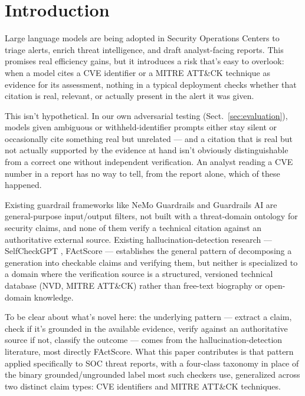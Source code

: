 \documentclass[pdflatex,sn-mathphys-num]{sn-jnl}%
\begin{document}

\maketitle

\section{Introduction}\label{sec:introduction}

Large language models are being adopted in Security Operations Centers
\cite{aisocsurvey2025} to triage alerts, enrich threat intelligence, and
draft analyst-facing reports. This promises real efficiency gains, but it
introduces a risk that's easy to overlook: when a model cites a CVE
identifier or a MITRE ATT\&CK technique as evidence for its assessment,
nothing in a typical deployment checks whether that citation is real,
relevant, or actually present in the alert it was given.

This isn't hypothetical. In our own adversarial testing
(Sect.~\ref{sec:evaluation}), models given ambiguous or
withheld-identifier prompts either stay silent or occasionally cite
something real but unrelated --- and a citation that is real but not
actually supported by the evidence at hand isn't obviously
distinguishable from a correct one without independent verification. An
analyst reading a CVE number in a report has no way to tell, from the
report alone, which of these happened.

Existing guardrail frameworks like NeMo Guardrails and Guardrails AI are
general-purpose input/output filters, not built with a threat-domain
ontology for security claims, and none of them verify a technical
citation against an authoritative external source. Existing
hallucination-detection research --- SelfCheckGPT \cite{selfcheckgpt2023},
FActScore \cite{factscore2023} --- establishes the general pattern of
decomposing a generation into checkable claims and verifying them, but
neither is specialized to a domain where the verification source is a
structured, versioned technical database (NVD, MITRE ATT\&CK) rather than
free-text biography or open-domain knowledge.

To be clear about what's novel here: the underlying pattern --- extract a
claim, check if it's grounded in the available evidence, verify against
an authoritative source if not, classify the outcome --- comes from the
hallucination-detection literature, most directly FActScore. What this
paper contributes is that pattern applied specifically to SOC threat
reports, with a four-class taxonomy in place of the binary
grounded/ungrounded label most such checkers use, generalized across two
distinct claim types: CVE identifiers and MITRE ATT\&CK techniques.
\end{document}
